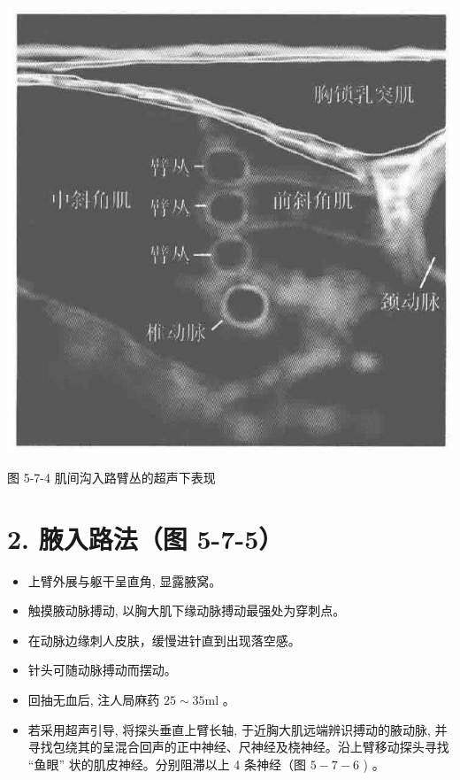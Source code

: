 \documentclass[10pt]{article}
\begin{document}
\begin{center}
\includegraphics[max width=\textwidth]{2024_07_05_645bb794a4d4f32ee0c8g-319}
\end{center}

图 5-7-4 肌间沟入路臂丛的超声下表现

\section*{2. 腋入路法（图 5-7-5）}
\begin{itemize}
  \item 上臂外展与躯干呈直角, 显露腋窝。

  \item 触摸腋动脉搏动, 以胸大肌下缘动脉搏动最强处为穿刺点。

  \item 在动脉边缘刺人皮肤，缓慢进针直到出现落空感。

  \item 针头可随动脉搏动而摆动。

  \item 回抽无血后, 注人局麻药 $25 \sim 35 \mathrm{ml}$ 。

  \item 若采用超声引导, 将探头垂直上臂长轴, 于近胸大肌远端辨识搏动的腋动脉, 并寻找包绕其的呈混合回声的正中神经、尺神经及桡神经。沿上臂移动探头寻找 “鱼眼” 状的肌皮神经。分别阻滞以上 4 条神经（图 $5-7-6$ ) 。

\end{itemize}
\end{document}
